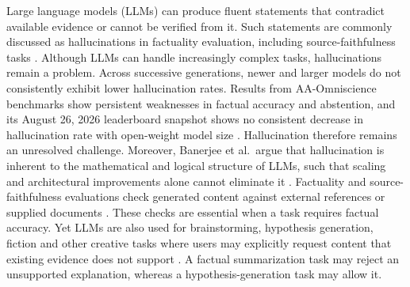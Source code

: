 \documentclass{clv2025}
\begin{document}
Large language models (LLMs) can produce fluent statements that contradict
available evidence or cannot be verified from it. 
Such statements are commonly discussed as hallucinations in factuality evaluation, including source-faithfulness tasks \citep{ji_survey_2023,huang_survey_2025}.
Although LLMs can handle increasingly complex tasks, hallucinations remain a problem.
Across successive generations, newer and larger models do not
consistently exhibit lower hallucination rates. Results from AA-Omniscience benchmarks show
persistent weaknesses in factual accuracy and abstention, and its August 26,
2026 leaderboard snapshot shows no consistent decrease in hallucination rate
with open-weight model size
\citep{jackson_aaomniscience_2025,artificialanalysis_omniscience_leaderboard_2026}.
Hallucination therefore remains an unresolved challenge. Moreover, Banerjee
et al.\ argue that hallucination is inherent to the mathematical and logical
structure of LLMs, such that scaling and architectural improvements alone
cannot eliminate it \citep{banerjee_llms_2024}.
Factuality and source-faithfulness evaluations check generated content against external references or supplied documents \citep{maynez_faithfulness_2020,kryscinski_evaluating_2020,min_factscore_2023}.
These checks are essential when a task requires factual accuracy.
Yet LLMs are also used for brainstorming, hypothesis generation,  fiction and other creative tasks
where users may explicitly request content that existing evidence does not
support \citep{franceschelli_creativity_2024,jiang_survey_2024}.
A factual summarization task may reject an unsupported explanation, whereas a hypothesis-generation task may allow it.
\end{document}
